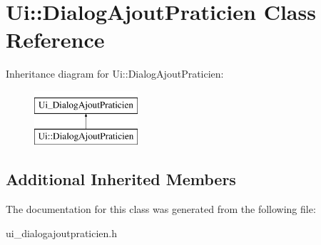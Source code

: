 \hypertarget{classUi_1_1DialogAjoutPraticien}{\section{Ui\-:\-:Dialog\-Ajout\-Praticien Class Reference}
\label{classUi_1_1DialogAjoutPraticien}
}
Inheritance diagram for Ui\-:\-:Dialog\-Ajout\-Praticien\-:\begin{figure}[H]
\begin{center}
\leavevmode
\includegraphics[height=2.000000cm]{classUi_1_1DialogAjoutPraticien}
\end{center}
\end{figure}
\subsection*{Additional Inherited Members}


The documentation for this class was generated from the following file\-:\begin{DoxyCompactItemize}
\item 
ui\-\_\-dialogajoutpraticien.\-h\end{DoxyCompactItemize}
